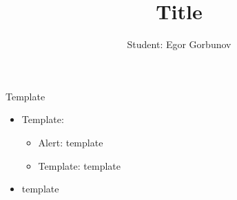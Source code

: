 
\makeatletter
{}
\makeatother
\graphicspath{{./fig/}}

\title{Title}
\author[Egor Gorbunov]{
	\hspace{5cm} Student: \hfill Egor Gorbunov
	\newline
}


\maketitle

\begin{frame}{Template}
\begin{itemize}
	\item Template:
		\begin{itemize}
			\item \alert{Alert}: template
			\item \alert{Template}: template
		\end{itemize}
	\item template
\end{itemize}
\end{frame}

